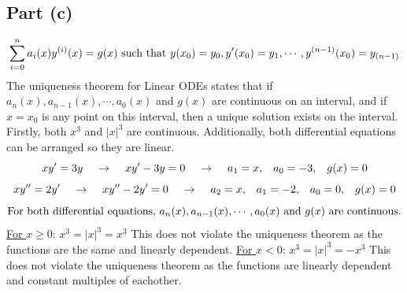 \documentclass{article}
\begin{document}
\subsection*{Part (c)}
\begin{center}
\[\sum_{i=0}^na_i(x)y^{(i)}(x)=g(x)\textnormal{ such that }y(x_0)=y_0, y'(x_0)=y_1,\cdots,y^{(n-1)}(x_0)=y_{(n-1)}\]
The uniqueness theorem for Linear ODEs states that if \(a_n(x),a_{n-1}(x),\cdots,a_0(x)\) and \(g(x)\) are continuous on an interval, and if \(x=x_0\) is any point on this interval, then a unique solution exists on the interval. Firstly, both \(x^3\) and \(|x|^3\) are continuous. Additionally, both differential equations can be arranged so they are linear.
\[xy'=3y\hspace{4 mm}\rightarrow\hspace{4 mm}xy'-3y=0\hspace{4 mm}\rightarrow\hspace{4 mm}a_1=x,\,\,\,\,\,a_0=-3,\,\,\,\,\,g(x)=0\]
\[xy''=2y'\hspace{4 mm}\rightarrow\hspace{4 mm}xy''-2y'=0\hspace{4 mm}\rightarrow\hspace{4 mm}a_2=x,\,\,\,\,\,a_1=-2,\,\,\,\,\,a_0=0,\,\,\,\,\,g(x)=0\]
\[\textnormal{For both differential equations, } a_n(x),a_{n-1}(x),\cdots,a_0(x) \textnormal{ and } g(x) \textnormal{ are continuous.}\]
\newline
\underline{For \(x\geq0\)}: \(x^3=|x|^3=x^3\) This does not violate the uniqueness theorem as the functions are the same and linearly dependent.
\newline
\newline
\underline{For \(x<0\)}: \(x^3=|x|^3=-x^3\) This does not violate the uniqueness theorem as the functions are linearly dependent and constant multiples of eachother.

\end{center}
\end{document}
